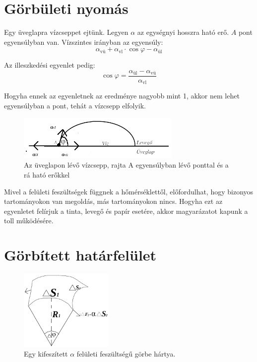 \documentclass[a4paper,titlepage,12pt]{article}
\begin{document}
\part*{Görbületi nyomás}

Egy üveglapra vízcseppet ejtünk. Legyen $\alpha$ az egységnyi hosszra ható erő. $A$ pont egyensúlyban van. Vízszintes irányban az egyensúly:
\[\alpha_{\text{vü}}+\alpha_{\text{vl}}\cdot\cos{\varphi}-\alpha_{\text{ül}}\]

\noindent
Az illeszkedési egyenlet pedig: \[\cos{\varphi}=\frac{\alpha_{\text{ül}}-\alpha_{\text{vü}}}{\alpha_{\text{vl}}}\]

\noindent
Hogyha ennek az egyenletnek az eredménye nagyobb mint 1, akkor nem lehet egyensúlyban a pont, tehát a vízcsepp elfolyik.

\begin{figure}[H]
	\begin{center}
		\includegraphics[width=0.7\textwidth]{tetel72.png}
		\caption{Az üveglapon lévő vízcsepp, rajta A egyensúlyban lévő ponttal és a rá ható erőkkel}
	\end{center}
\end{figure}

\noindent
Mivel a felületi feszültségek függnek a hőmérséklettől, előfordulhat, hogy bizonyos tartományokon van megoldás, más tartományokon nincs. Hogyha ezt az egyenletet felírjuk a tinta, levegő és papír esetére, akkor magyarázatot kapunk a toll működésére.

\part*{Görbített határfelület}

\begin{figure}[H]
	\begin{center}
		\includegraphics[width=0.4\textwidth]{tetel73.png}
		\caption{Egy kifeszített $\alpha$ felületi feszültségű görbe hártya. }
	\end{center}
\end{figure}
\end{document}
